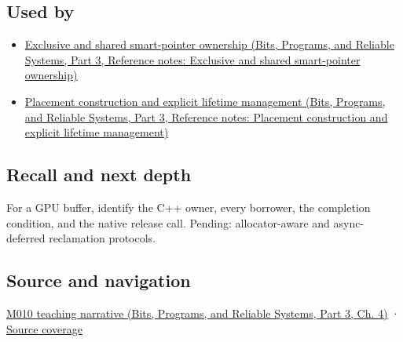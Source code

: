 \subsection{Used by}\label{appendix-69739d3ab49b-used-by}

\hypertarget{appendix-69739d3ab49b-used-by}{}

\begin{itemize}
\tightlist
\item
  \href{../01-Bits-Programs-and-Reliable-Systems-P03/main.pdf\#appendix-51602cabe815}{Exclusive and shared smart-pointer ownership (Bits, Programs, and Reliable Systems, Part 3, Reference notes: Exclusive and shared smart-pointer ownership)}
\item
  \href{../01-Bits-Programs-and-Reliable-Systems-P03/main.pdf\#appendix-f56c3e43fd4e}{Placement construction and explicit lifetime management (Bits, Programs, and Reliable Systems, Part 3, Reference notes: Placement construction and explicit lifetime management)}
\end{itemize}

\subsection{Recall and next depth}\label{appendix-69739d3ab49b-recall-and-next-depth}

\hypertarget{appendix-69739d3ab49b-recall-and-next-depth}{}

For a GPU buffer, identify the C++ owner, every borrower, the completion condition, and the native release call. Pending: allocator-aware and async-deferred reclamation protocols.

\subsection{Source and navigation}\label{appendix-69739d3ab49b-source-and-navigation}

\hypertarget{appendix-69739d3ab49b-source-and-navigation}{}

\href{../01-Bits-Programs-and-Reliable-Systems-P03/main.pdf\#01-foundations-i-ch004-from-a-live-object-to-responsible-resource-ownership}{M010 teaching narrative (Bits, Programs, and Reliable Systems, Part 3, Ch. 4)} · \hyperref[appendix-fd090d982a15-m010---parts-148-160]{Source coverage}

